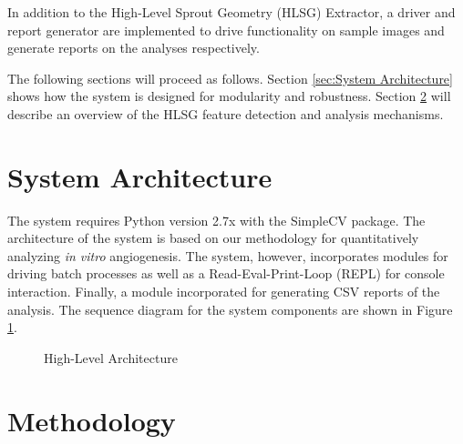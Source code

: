 \documentclass{sig-alternate}
\newcommand{\invitro}{\emph{in vitro} }
\begin{document}
	In addition to the High-Level Sprout Geometry (HLSG) Extractor, a driver
	and report generator are implemented to drive functionality on sample
	images and generate reports on the analyses respectively.

	The following sections will proceed as follows. Section \ref{sec:System
	Architecture} shows how the system is designed for modularity and
	robustness. Section \ref{sec:Methodology} will describe an overview of
	the HLSG feature detection and analysis mechanisms. 

\section{System Architecture} %
\label{sec:System Architecture}
	The system requires Python version 2.7x with the SimpleCV package. The
	architecture of the system is based on our methodology for
	quantitatively analyzing \invitro angiogenesis. The system, however,
	incorporates modules for driving batch processes as well as a
	Read-Eval-Print-Loop (REPL) for console interaction. Finally, a module
	incorporated for generating CSV reports of the analysis. The sequence
	diagram for the system components are shown in Figure
	\ref{fig:sysarch}.
	\begin{figure}[ht!]
		\centering
		
		\caption{High-Level Architecture}
		\label{fig:sysarch}
	\end{figure}



\section{Methodology} %
\label{sec:Methodology}
\end{document}
